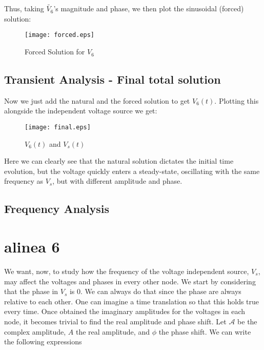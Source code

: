 Thus, taking $\tilde{V_6}$'s magnitude and phase, we then plot the sinusoidal (forced) solution:

\begin{figure}[H]
  \centering
  \texttt{[image: forced.eps]}
  \caption{Forced Solution for $V_{6}$}
  \label{fig:OctaveForcedSolution}
\end{figure}

\subsection{Transient Analysis - Final total solution}
Now we just add the natural and the forced solution to get $V_6(t)$. Plotting this alongside the independent voltage source we get:

\begin{figure}[H]
  \centering
  \texttt{[image: final.eps]}
  \caption{$V_6(t)$ and $V_s(t)$}
  \label{fig:OctaveFinalSolution}
\end{figure}

Here we can clearly see that the natural solution dictates the initial time evolution, but the voltage quickly enters a steady-state, oscillating with the same frequency as $V_s$, but
with different amplitude and phase.


\subsection{Frequency Analysis}

\section{alinea 6}
We want, now, to study how the frequency of the voltage independent source, $V_s$, may affect the voltages and phases in every other node.
We start by considering that the phase in $V_s$ is 0. We can always do that since the phase are always relative to each other. One can imagine a time translation so that this holds true every time.
Once obtained the imaginary amplitudes for the voltages in each node, it becomes trivial to find the real amplitude and phase shift.
Let $\mathcal{A}$ be the complex amplitude, $A$ the real amplitude, and $\phi$ the phase shift. We can write the following expressions

